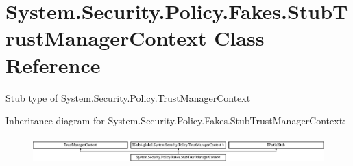 \hypertarget{class_system_1_1_security_1_1_policy_1_1_fakes_1_1_stub_trust_manager_context}{\section{System.\-Security.\-Policy.\-Fakes.\-Stub\-Trust\-Manager\-Context Class Reference}
\label{class_system_1_1_security_1_1_policy_1_1_fakes_1_1_stub_trust_manager_context}
}


Stub type of System.\-Security.\-Policy.\-Trust\-Manager\-Context 


Inheritance diagram for System.\-Security.\-Policy.\-Fakes.\-Stub\-Trust\-Manager\-Context\-:\begin{figure}[H]
\begin{center}
\leavevmode
\includegraphics[height=1.022831cm]{class_system_1_1_security_1_1_policy_1_1_fakes_1_1_stub_trust_manager_context}
\end{center}
\end{figure}
